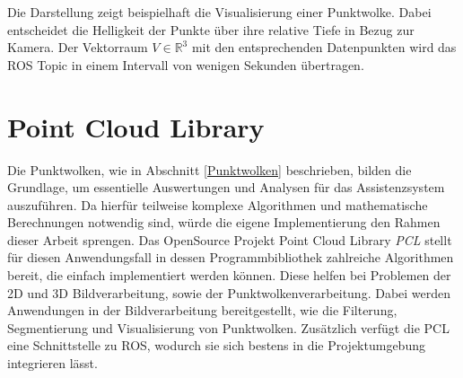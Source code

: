 Die Darstellung zeigt beispielhaft die Visualisierung einer Punktwolke. Dabei entscheidet die Helligkeit der Punkte über ihre relative Tiefe in Bezug zur Kamera. Der Vektorraum $V \in \mathbb{R}^3$ mit den entsprechenden Datenpunkten wird das ROS Topic in einem Intervall von wenigen Sekunden übertragen.\newline

\section{Point Cloud Library}

Die Punktwolken, wie in Abschnitt \ref{Punktwolken} beschrieben, bilden die Grundlage, um essentielle Auswertungen und Analysen für das Assistenzsystem auszuführen. Da hierfür teilweise komplexe Algorithmen und mathematische Berechnungen notwendig sind, würde die eigene Implementierung den Rahmen dieser Arbeit sprengen. \newline
Das OpenSource Projekt Point Cloud Library \emph{PCL} stellt für diesen Anwendungsfall in dessen Programmbibliothek zahlreiche Algorithmen bereit, die einfach implementiert werden können. Diese helfen bei Problemen der 2D und 3D Bildverarbeitung, sowie der Punktwolkenverarbeitung. %
Dabei werden Anwendungen in der Bildverarbeitung bereitgestellt, wie die Filterung, Segmentierung und Visualisierung von Punktwolken. \newline
Zusätzlich verfügt die PCL eine Schnittstelle zu ROS, wodurch sie sich bestens in die Projektumgebung integrieren lässt.